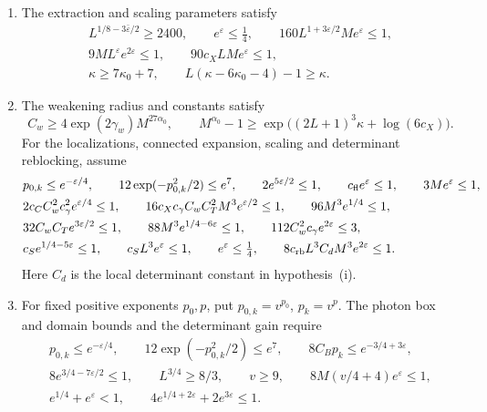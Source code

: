 \documentclass[11pt,letterpaper,reqno]{amsart}
\begin{document}
\begin{theorem}
\begin{enumerate}[label=\textup{(\roman*)},leftmargin=*]
\item The extraction and scaling parameters satisfy
\begin{equation}\label{eq:nlm-normalization-hypotheses}
 \begin{gathered}
 L^{1/8-3\bar\varepsilon/2}\ge2400,\qquad e^\varepsilon\le\tfrac14,\qquad
 160L^{1+3\varepsilon/2}Me^\varepsilon\le1,\\
 9ML^\varepsilon e^{2\varepsilon}\le1,\qquad
 90c_XLMe^\varepsilon\le1,\\
 \kappa\ge7\kappa_0+7,\qquad
 L(\kappa-6\kappa_0-4)-1\ge\kappa .
 \end{gathered}
\end{equation}
\item The weakening radius and constants satisfy
\[
 C_w\ge4\exp(2\gamma_w)M^{27\alpha_0},\qquad
 M^{\alpha_0}-1\ge\exp\big((2L+1)^3\kappa+\log(6c_X)\big).
\]
For the localizations, connected expansion, scaling and determinant
reblocking, assume
\begin{align}
 &p_{0,k}\le e^{-\varepsilon/4},\qquad
       12\exp(-p_{0,k}^2/2)\le e^7,\qquad
       2e^{5\varepsilon/2}\le1,\qquad
       c_{\mathrm{fl}}e^\varepsilon\le1,\qquad3Me^\varepsilon\le1,
                                                        \notag\\
 &2c_CC_w^2c_\gamma^2e^{\varepsilon/4}\le1,\qquad
       16c_Xc_\gamma C_wC_T^2M^3e^{\varepsilon/2}\le1,\qquad
       96M^3e^{1/4}\le1,                                \notag\\
 &32C_wC_Te^{3\varepsilon/2}\le1,\qquad
       88M^3e^{1/4-6\varepsilon}\le1,\qquad
       112C_w^2c_\gamma e^{2\varepsilon}\le3,             \notag\\
 &c_Se^{1/4-5\varepsilon}\le1,\qquad
       c_SL^3e^\varepsilon\le1,\qquad e^\varepsilon\le\tfrac14,\qquad
       8c_{\mathrm{rb}}L^3C_dM^3e^{2\varepsilon}\le1.
                                      \label{eq:rgnl-fixed-smallness}
\end{align}
Here $C_d$ is the local determinant constant in hypothesis~(i).
\item For fixed positive exponents \(p_0,p\), put
\(p_{0,k}=v^{p_0}\), \(p_k=v^p\). The photon box and domain bounds
and the determinant gain require
\[
 \begin{gathered}
 p_{0,k}\le e^{-\varepsilon/4},\qquad
 12\exp(-p_{0,k}^2/2)\le e^7,\qquad
 8C_Bp_k\le e^{-3/4+3\varepsilon},\\
 8e^{3/4-7\varepsilon/2}\le1,\qquad L^{3/4}\ge8/3,\qquad
 v\ge9,\qquad 8M(v/4+4)e^\varepsilon\le1,\\
 e^{1/4}+e^\varepsilon<1,\qquad
 4e^{1/4+2\varepsilon}+2e^{3\varepsilon}\le1 .
 \end{gathered}
\]


\end{enumerate}
\end{theorem}
\end{document}
